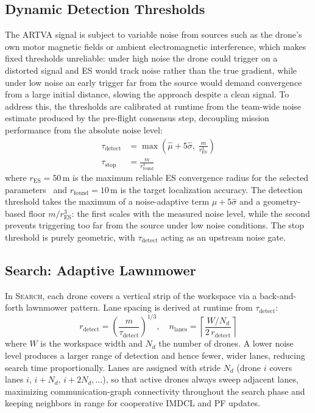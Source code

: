 \documentclass[journal,10pt,twocolumn]{IEEEtran}
\begin{document}
\subsection{Dynamic Detection Thresholds}
\label{sec:thresholds}
The ARTVA signal is subject to variable noise from sources such as
the drone's own motor magnetic fields or ambient electromagnetic
interference, which makes fixed thresholds unreliable: under high
noise the drone could trigger on a distorted signal and ES would
track noise rather than the true gradient, while under low noise an
early trigger far from the source would demand convergence from a
large initial distance, slowing the approach despite a clean signal.
To address this, the thresholds are calibrated at runtime from the
team-wide noise estimate produced by the pre-flight consensus step,
decoupling mission performance from the absolute noise level:
\begin{align}
  \tau_{\text{detect}} &= \max\!\left(
    \hat{\mu} + 5\hat{\sigma},\;
    \frac{m}{r_{\text{ES}}^3}
  \right)
  \label{eq:detect_thr}\\
  \tau_{\text{stop}} &= \frac{m}{r_{\text{found}}^3}
  \label{eq:stop_thr}
\end{align}
where $r_{\text{ES}} = 50$\,m is the maximum reliable ES convergence
radius for the selected parameters~\cite{Azzollini2021} and
$r_{\text{found}} = 10$\,m is the target localization accuracy.
The detection threshold takes the maximum of a noise-adaptive term
$\hat{\mu} + 5\hat{\sigma}$ and a geometry-based floor $m/r_{\text{ES}}^3$:
the first scales with the measured noise level, while the second
prevents triggering too far from the source under low noise conditions.
The stop threshold is purely geometric, with $\tau_{\text{detect}}$
acting as an upstream noise gate.

\subsection{Search: Adaptive Lawnmower}
\label{sec:lawnmower}

In \textsc{Search}, each drone covers a vertical strip of the workspace
via a back-and-forth lawnmower pattern.  Lane spacing is derived at runtime from
$\tau_{\text{detect}}$:
\begin{equation}
  r_{\text{detect}} = \left(\frac{m}{\tau_{\text{detect}}}\right)^{1/3},
  \quad
  n_{\text{lanes}} = \left\lceil \frac{W/N_d}{2\,r_{\text{detect}}}
  \right\rceil
  \label{eq:lanes}
\end{equation}
where $W$ is the workspace width and $N_d$ the number of drones.
A lower noise level produces a larger range of detection and hence
fewer, wider lanes, reducing search time proportionally.
Lanes are assigned with stride $N_d$ (drone $i$ covers lanes $i,\,
i{+}N_d,\, i{+}2N_d, \ldots$), so that active drones always sweep
adjacent lanes, maximizing communication-graph connectivity throughout
the search phase and keeping neighbors in range for cooperative IMDCL
and PF updates.
\end{document}
